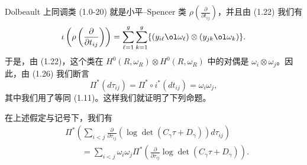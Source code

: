 Dolbeault 上同调类 (1.0-20) 就是小平–Spencer 类 $\rho\left(\frac{\partial}{\partial t_{ij}}\right)$，并且由 (1.22) 我们有
\[
  \iota\left(\rho\left(\frac{\partial}{\partial t_{ij}}\right)\right)
  =\sum_{\ell=1}^{g}\sum_{k=1}^{g}\{(y_{i\ell}\ol\omega_\ell)\otimes(y_{jk}\ol\omega_k)\}.
\]
于是，由 (1.22)，这个类在 $H^0(R,\omega_R)\otimes H^0(R,\omega_R)$ 中的对偶是 $\omega_i\otimes\omega_j$。因此，由 (1.26) 我们断言
\begin{equation}
  \Pi^*(d\tau_{ij})=\Pi^*\circ i^*(dt_{ij})=\omega_i\omega_j, \tag{1.29}
\end{equation}
其中我们用了等同 (1.11)。这样我们就证明了下列命题。

\begin{proposition}[1.9]
在上述假定与记号下，我们有
\begin{equation}
\begin{aligned}
  &\Pi^*\left(\sum_{i<j}\frac{\partial}{\partial\tau_{ij}}\left(\log\det(C_\gamma\tau+D_\gamma)\right)d\tau_{ij}\right)\\
  &\qquad =\sum_{i<j}\omega_i\omega_j\Pi^*\left(\frac{\partial}{\partial\tau_{ij}}\log\det(C_\gamma\tau+D_\gamma)\right).
\end{aligned} \tag{1.30}
\end{equation}
\end{proposition}

